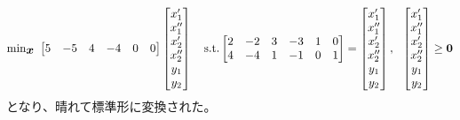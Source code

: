 \documentclass[dvipdfmx, 9pt, a4paper]{jsarticle}
\numberwithin{equation}{section}
\newcommand{\bm}[1]{{\mbox{\boldmath $#1$}}}
\begin{document}
\begin{equation}
{\rm min}_{\bm x}~
\begin{bmatrix}
5 & -5 & 4 & -4 & 0 & 0
\end{bmatrix}
\begin{bmatrix}
x_1' \\ x_1'' \\ x_2' \\ x_2'' \\ y_1 \\ y_2
\end{bmatrix}
~~~{\rm s.t.}
\begin{bmatrix}
2 & -2 & 3 & -3 & 1 & 0 \\
4 & -4 & 1 & -1 & 0 & 1
\end{bmatrix}
=
\begin{bmatrix}
x_1' \\ x_1'' \\ x_2' \\ x_2'' \\ y_1 \\ y_2
\end{bmatrix},~~
\begin{bmatrix}
x_1' \\ x_1'' \\ x_2' \\ x_2'' \\ y_1 \\ y_2
\end{bmatrix} \geq \bm 0 \notag
\end{equation}
となり、晴れて標準形に変換された。
\end{document}
